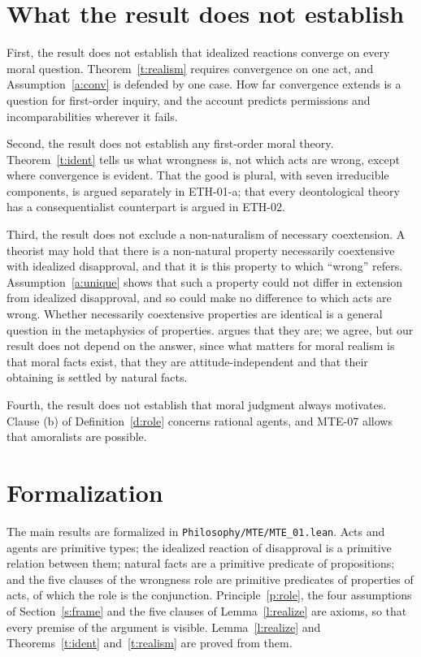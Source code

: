 \documentclass{situationist-preprint}
\begin{document}
\section{What the result does not establish}\label{s:not}

First, the result does not establish that idealized reactions converge on every moral question. Theorem~\ref{t:realism} requires convergence on one act, and Assumption~\ref{a:conv} is defended by one case. How far convergence extends is a question for first-order inquiry, and the account predicts permissions and incomparabilities wherever it fails.

Second, the result does not establish any first-order moral theory. Theorem~\ref{t:ident} tells us what wrongness is, not which acts are wrong, except where convergence is evident. That the good is plural, with seven irreducible components, is argued separately in ETH-01-a; that every deontological theory has a consequentialist counterpart is argued in ETH-02.

Third, the result does not exclude a non-naturalism of necessary coextension. A theorist may hold that there is a non-natural property necessarily coextensive with idealized disapproval, and that it is this property to which \enquote{wrong} refers. Assumption~\ref{a:unique} shows that such a property could not differ in extension from idealized disapproval, and so could make no difference to which acts are wrong. Whether necessarily coextensive properties are identical is a general question in the metaphysics of properties. \citet{Jackson1998} argues that they are; we agree, but our result does not depend on the answer, since what matters for moral realism is that moral facts exist, that they are attitude-independent and that their obtaining is settled by natural facts.

Fourth, the result does not establish that moral judgment always motivates. Clause (b) of Definition~\ref{d:role} concerns rational agents, and MTE-07 allows that amoralists are possible.

\section{Formalization}\label{s:formal}

The main results are formalized in \nolinkurl{Philosophy/MTE/MTE_01.lean}. Acts and agents are primitive types; the idealized reaction of disapproval is a primitive relation between them; natural facts are a primitive predicate of propositions; and the five clauses of the wrongness role are primitive predicates of properties of acts, of which the role is the conjunction. Principle~\ref{p:role}, the four assumptions of Section~\ref{s:frame} and the five clauses of Lemma~\ref{l:realize} are axioms, so that every premise of the argument is visible. Lemma~\ref{l:realize} and Theorems~\ref{t:ident} and~\ref{t:realism} are proved from them.
\end{document}
